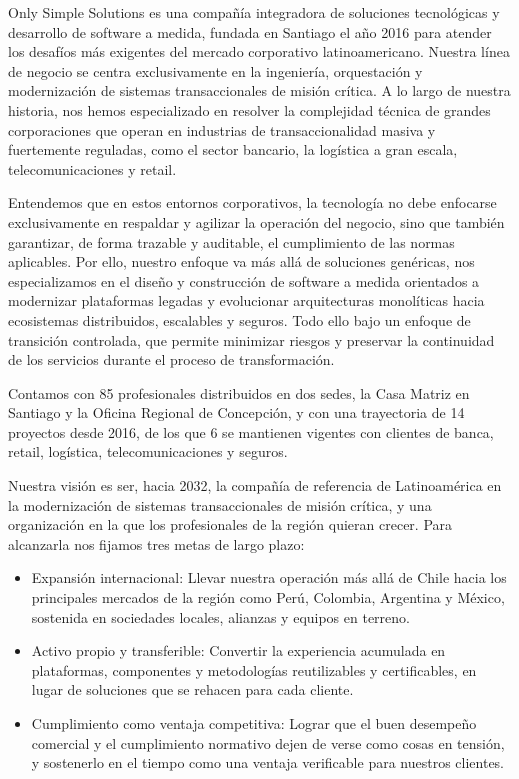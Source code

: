 \documentclass[11pt]{article}
\providecommand{\tightlist}{%
  \setlength{\itemsep}{0pt}\setlength{\parskip}{0pt}}
\begin{document}
Only Simple Solutions es una compañía integradora de soluciones tecnológicas y desarrollo de software a medida, fundada en Santiago el año 2016 para atender los desafíos más exigentes del mercado corporativo latinoamericano. Nuestra línea de negocio se centra exclusivamente en la ingeniería, orquestación y modernización de sistemas transaccionales de misión crítica. A lo largo de nuestra historia, nos hemos especializado en resolver la complejidad técnica de grandes corporaciones que operan en industrias de transaccionalidad masiva y fuertemente reguladas, como el sector bancario, la logística a gran escala, telecomunicaciones y retail.

Entendemos que en estos entornos corporativos, la tecnología no debe enfocarse exclusivamente en respaldar y agilizar la operación del negocio, sino que también garantizar, de forma trazable y auditable, el cumplimiento de las normas aplicables. Por ello, nuestro enfoque va más allá de soluciones genéricas, nos especializamos en el diseño y construcción de software a medida orientados a modernizar plataformas legadas y evolucionar arquitecturas monolíticas hacia ecosistemas distribuidos, escalables y seguros. Todo ello bajo un enfoque de transición controlada, que permite minimizar riesgos y preservar la continuidad de los servicios durante el proceso de transformación.

Contamos con 85 profesionales distribuidos en dos sedes, la Casa Matriz en Santiago y la Oficina Regional de Concepción, y con una trayectoria de 14 proyectos desde 2016, de los que 6 se mantienen vigentes con clientes de banca, retail, logística, telecomunicaciones y seguros.

Nuestra visión es ser, hacia 2032, la compañía de referencia de Latinoamérica en la modernización de sistemas transaccionales de misión crítica, y una organización en la que los profesionales de la región quieran crecer. Para alcanzarla nos fijamos tres metas de largo plazo:

\begin{itemize}
\tightlist
\item
  Expansión internacional: Llevar nuestra operación más allá de Chile hacia los principales mercados de la región como Perú, Colombia, Argentina y México, sostenida en sociedades locales, alianzas y equipos en terreno.
\item
  Activo propio y transferible: Convertir la experiencia acumulada en plataformas, componentes y metodologías reutilizables y certificables, en lugar de soluciones que se rehacen para cada cliente.
\item
  Cumplimiento como ventaja competitiva: Lograr que el buen desempeño comercial y el cumplimiento normativo dejen de verse como cosas en tensión, y sostenerlo en el tiempo como una ventaja verificable para nuestros clientes.
\end{itemize}
\end{document}
